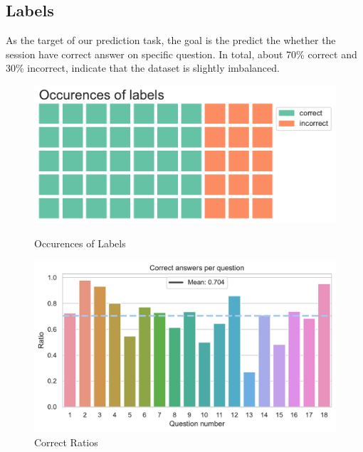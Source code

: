 \documentclass[11pt,a4paper]{article}
\begin{document}
    \subsection{Labels}
    \label{sec:labels}
    As the target of our prediction task, the goal is the predict the whether the session have correct answer on specific question. In total, about 70\% correct and 30\% incorrect, indicate that the dataset is slightly imbalanced.
    \begin{figure}[H]
        \centering
        \begin{minipage}{0.5\textwidth}
            \centering
            \includegraphics[width=\textwidth]{EDA_plot/labels.pdf} %
            \caption{Occurences of Labels}
        \end{minipage}\hfill
        \begin{minipage}{0.5\textwidth}
            \centering
            \includegraphics[width=\textwidth]{EDA_plot/correct_ratios.pdf} %
            \caption{Correct Ratios}
            \label{fig:correct_ratios}
        \end{minipage}
    \end{figure}
    
\end{document}
